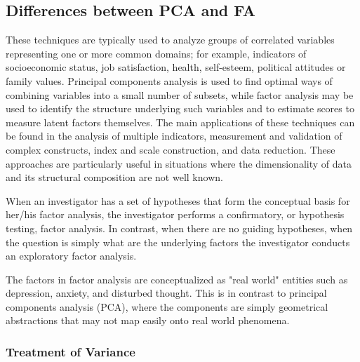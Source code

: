 \documentclass[a4paper,12pt]{article}
\begin{document}
\subsection{Differences between PCA and FA}
These techniques are typically used to analyze groups of correlated variables representing one or more common domains; for example, indicators of socioeconomic status, job satisfaction, health, self-esteem, political attitudes or family values. 
Principal components analysis is used to find optimal ways of combining variables into a small number of subsets, while factor analysis may be used to identify the structure underlying such variables and to estimate scores to measure latent factors themselves. The main applications of these techniques can be found in the analysis of multiple indicators, measurement and validation of complex constructs, index and scale construction, and data reduction. These approaches are particularly useful in situations where the dimensionality of data and its structural composition are not well known.

When an investigator has a set of hypotheses that form the conceptual basis for her/his factor analysis, the investigator performs a confirmatory, or hypothesis testing, factor analysis. In contrast, when there are no guiding hypotheses, when the question is simply what are the underlying factors the investigator conducts an exploratory factor analysis. 

The factors in factor analysis are conceptualized as "real world" entities such as depression, anxiety, and disturbed thought. This is in contrast to principal components analysis (PCA), where the components are simply geometrical abstractions that may not map easily onto real world phenomena.

\subsubsection{ Treatment of Variance}
\end{document}
